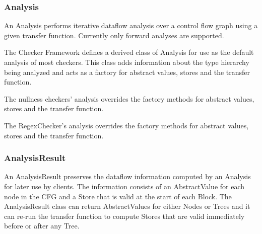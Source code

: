 \subsubsection{Analysis}
\label{sec:analysis_classes}

    An Analysis performs iterative dataflow analysis over a control flow graph using a given transfer function.  Currently only forward analyses are supported.


    The Checker Framework defines a derived class of Analysis for use as the default analysis of most checkers.  This class adds information about the type hierarchy being analyzed and acts as a factory for abstract values, stores and the transfer function.

    

    The nullness checkers' analysis overrides the factory methods for abstract values, stores and the transfer function.

    
    The RegexChecker's analysis overrides the factory methods for abstract values, stores and the transfer function.



\subsubsection{AnalysisResult}
\label{sec:analysis_result_class}

    An AnalysisResult preserves the dataflow information computed by an Analysis for later use by clients.  The information consists of an AbstractValue for each node in the CFG and a Store that is valid at the start of each Block.  The AnalysisResult class can return AbstractValues for either Nodes or Trees and it can re-run the transfer function to compute Stores that are valid immediately before or after any Tree.

